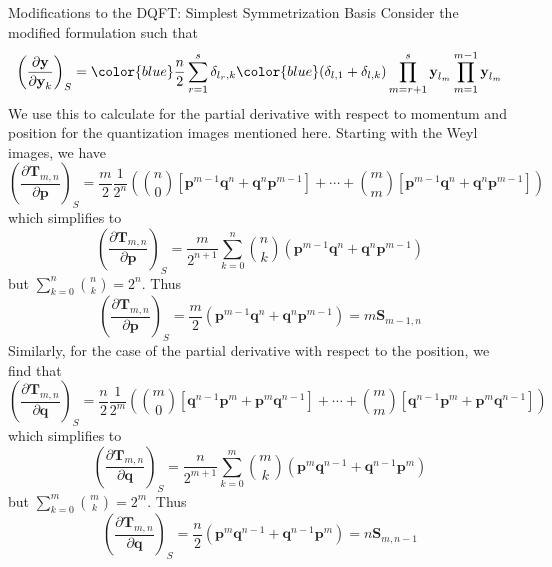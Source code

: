 \documentclass[aspectratio=169]{beamer}
\begin{document}
	\begin{frame}[allowframebreaks]{Modifications to the DQFT: Simplest Symmetrization Basis}
		Consider the modified formulation such that
		\begin{equation}
			\left( \frac{\partial\textbf{y}}{\partial\textbf{y}_k}\right)_S={\color{blue}\frac{n}{2}}\sum_{r=1}^s\delta_{l_r,k}{\color{blue}(\delta_{l,1}+\delta_{l,k})}\prod_{m=r+1}^s\textbf{y}_{l_m}\prod_{m=1}^{m-1}\textbf{y}_{l_m}
		\end{equation}
		We use this to calculate for the partial derivative with respect to momentum and position for the quantization images mentioned here. Starting with the Weyl images, we have
		\begin{equation}
			\left( \frac{\partial\textbf{T}_{m,n}}{\partial\textbf{p}}\right) _S=\frac{m}{2}\frac{1}{2^n}\left(\binom{n}{0}[\textbf{p}^{m-1}\textbf{q}^n+\textbf{q}^{n}\textbf{p}^{m-1}]+\cdots+\binom{m}{m}[\textbf{p}^{m-1}\textbf{q}^n+\textbf{q}^{n}\textbf{p}^{m-1}]\right)
		\end{equation}
		which simplifies to
		\begin{equation}
			\left( \frac{\partial\textbf{T}_{m,n}}{\partial\textbf{p}}\right) _S=\frac{m}{2^{n+1}}\sum_{k=0}^n\binom{n}{k}(\textbf{p}^{m-1}\textbf{q}^n+\textbf{q}^n\textbf{p}^{m-1})
		\end{equation}
		but $\displaystyle\sum_{k=0}^n\binom{n}{k}=2^n$. Thus
		\begin{equation}
			\left( \frac{\partial\textbf{T}_{m,n}}{\partial\textbf{p}}\right) _S=\frac{m}{2}(\textbf{p}^{m-1}\textbf{q}^n+\textbf{q}^n\textbf{p}^{m-1})=m\textbf{S}_{m-1,n}
		\end{equation}
		Similarly, for the case of the partial derivative with respect to the position, we find that
		\begin{equation}
			\left( \frac{\partial\textbf{T}_{m,n}}{\partial\textbf{q}}\right) _S=\frac{n}{2}\frac{1}{2^m}\left(\binom{m}{0}[\textbf{q}^{n-1}\textbf{p}^m+\textbf{p}^m\textbf{q}^{n-1}]+\cdots+\binom{m}{m}[\textbf{q}^{n-1}\textbf{p}^m+\textbf{p}^m\textbf{q}^{n-1}]\right)
		\end{equation}
		which simplifies to
		\begin{equation}
			\left( \frac{\partial\textbf{T}_{m,n}}{\partial\textbf{q}}\right) _S=\frac{n}{2^{m+1}}\sum_{k=0}^m\binom{m}{k}(\textbf{p}^{m}\textbf{q}^{n-1}+\textbf{q}^{n-1}\textbf{p}^{m})
		\end{equation}
		but $\displaystyle\sum_{k=0}^m\binom{m}{k}=2^m$. Thus
		\begin{equation}
			\left( \frac{\partial\textbf{T}_{m,n}}{\partial\textbf{q}}\right) _S=\frac{n}{2}(\textbf{p}^{m}\textbf{q}^{n-1}+\textbf{q}^{n-1}\textbf{p}^{m})=n\textbf{S}_{m,n-1}
		\end{equation}
		

\end{frame}
\end{document}
